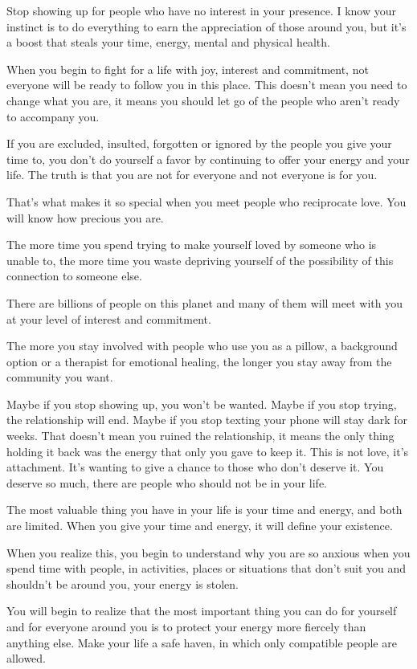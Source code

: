 Stop showing up for people who have no interest in your presence. I know your instinct is to do everything to earn the appreciation of those around you, but it's a boost that steals your time, energy, mental and physical health.

When you begin to fight for a life with joy, interest and commitment, not everyone will be ready to follow you in this place. This doesn't mean you need to change what you are, it means you should let go of the people who aren't ready to accompany you.

If you are excluded, insulted, forgotten or ignored by the people you give your time to, you don't do yourself a favor by continuing to offer your energy and your life. The truth is that you are not for everyone and not everyone is for you.

That's what makes it so special when you meet people who reciprocate love. You will know how precious you are.

The more time you spend trying to make yourself loved by someone who is unable to, the more time you waste depriving yourself of the possibility of this connection to someone else.

There are billions of people on this planet and many of them will meet with you at your level of interest and commitment.

The more you stay involved with people who use you as a pillow, a background option or a therapist for emotional healing, the longer you stay away from the community you want.

Maybe if you stop showing up, you won't be wanted. Maybe if you stop trying, the relationship will end. Maybe if you stop texting your phone will stay dark for weeks. That doesn't mean you ruined the relationship, it means the only thing holding it back was the energy that only you gave to keep it. This is not love, it's attachment. It's wanting to give a chance to those who don't deserve it. You deserve so much, there are people who should not be in your life.

The most valuable thing you have in your life is your time and energy, and both are limited. When you give your time and energy, it will define your existence.

When you realize this, you begin to understand why you are so anxious when you spend time with people, in activities, places or situations that don't suit you and shouldn't be around you, your energy is stolen.

You will begin to realize that the most important thing you can do for yourself and for everyone around you is to protect your energy more fiercely than anything else. Make your life a safe haven, in which only compatible people are allowed.

